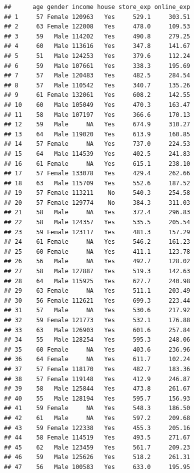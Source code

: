 \documentclass[12pt,]{krantz}
\theoremstyle{definition}
\theoremstyle{definition}
\theoremstyle{remark}
\begin{document}
\begin{verbatim}
##      age gender income house store_exp online_exp
## 1     57 Female 120963   Yes     529.1     303.51
## 2     63 Female 122008   Yes     478.0     109.53
## 3     59   Male 114202   Yes     490.8     279.25
## 4     60   Male 113616   Yes     347.8     141.67
## 5     51   Male 124253   Yes     379.6     112.24
## 6     59   Male 107661   Yes     338.3     195.69
## 7     57   Male 120483   Yes     482.5     284.54
## 8     57   Male 110542   Yes     340.7     135.26
## 9     61 Female 132061   Yes     608.2     142.55
## 10    60   Male 105049   Yes     470.3     163.47
## 11    58   Male 107197   Yes     366.6     170.13
## 12    59   Male     NA   Yes     674.9     310.27
## 13    64   Male 119020   Yes     613.9     160.85
## 14    57 Female     NA   Yes     737.0     224.53
## 15    64   Male 114539   Yes     402.5     241.83
## 16    61 Female     NA   Yes     615.1     238.10
## 17    57 Female 133078   Yes     429.4     262.66
## 18    63   Male 115709   Yes     552.6     187.52
## 19    57 Female 113211    No     540.3     254.58
## 20    57 Female 129774    No     384.3     311.03
## 21    58   Male     NA   Yes     372.4     296.83
## 22    58   Male 124357   Yes     535.5     205.54
## 23    59 Female 123117   Yes     481.3     157.29
## 24    61 Female     NA   Yes     546.2     161.23
## 25    60 Female     NA   Yes     411.1     123.78
## 26    56   Male     NA   Yes     492.7     128.02
## 27    58   Male 127887   Yes     519.3     142.63
## 28    64   Male 115925   Yes     627.7     240.98
## 29    63 Female     NA   Yes     511.1     203.49
## 30    56 Female 112621   Yes     699.3     223.44
## 31    57   Male     NA   Yes     530.6     217.92
## 32    59 Female 121773   Yes     532.1     176.88
## 33    63   Male 126903   Yes     601.6     257.84
## 34    55   Male 128254   Yes     595.3     248.06
## 35    60 Female     NA   Yes     403.6     236.96
## 36    64 Female     NA   Yes     611.7     102.24
## 37    57 Female 118170   Yes     482.7     183.36
## 38    57 Female 119148   Yes     412.9     246.87
## 39    58   Male 125844   Yes     473.8     261.67
## 40    55   Male 128194   Yes     595.7     156.93
## 41    59 Female     NA   Yes     548.3     186.50
## 42    61   Male     NA   Yes     597.2     209.68
## 43    59 Female 122338   Yes     455.3     205.16
## 44    58 Female 114519   Yes     493.5     271.67
## 45    62   Male 123459   Yes     561.7     209.23
## 46    59   Male 125626   Yes     518.2     261.31
## 47    56   Male 100583   Yes     633.0     195.95

\end{verbatim}
\end{document}
